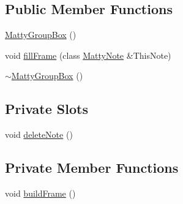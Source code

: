 \subsection*{Public Member Functions}
\begin{DoxyCompactItemize}
\item 
\hyperlink{classMattyGroupBox_aa44b29a1b8b8f5129f52c2972c24aecd}{Matty\+Group\+Box} ()
\item 
void \hyperlink{classMattyGroupBox_a4cbc1800e9ec63cdd0e064d3a3738b80}{fill\+Frame} (class \hyperlink{classMattyNote}{Matty\+Note} \&This\+Note)
\item 
\hyperlink{classMattyGroupBox_acf5f5023cf210a83e9846a35b149dd70}{$\sim$\+Matty\+Group\+Box} ()
\end{DoxyCompactItemize}
\subsection*{Private Slots}
\begin{DoxyCompactItemize}
\item 
void \hyperlink{classMattyGroupBox_ac7b7f1db6ea96e4c4b0f58fb87f86900}{delete\+Note} ()
\end{DoxyCompactItemize}
\subsection*{Private Member Functions}
\begin{DoxyCompactItemize}
\item 
void \hyperlink{classMattyGroupBox_ae9862aae672bd2cf4a99da541beef696}{build\+Frame} ()
\end{DoxyCompactItemize}
